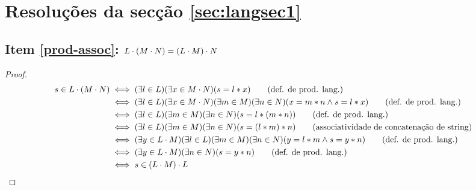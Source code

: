 \section{Resoluções da secção \ref{sec:langsec1}}

\subsection{Item \ref{prod-assoc}: $L \cdot (M \cdot N) = (L \cdot M) \cdot N$}

\begin{proof}
	\begin{align*}
	s \in \prodlang{L}{(\prodlang{M}{N})} 
	& \iff (\exists l \in L)( \exists x \in \prodlang{M}{N})(s = l \strconcat x) \tag{def. de prod. lang.}
	\\ & \iff (\exists l \in L)( \exists x \in \prodlang{M}{N})(\exists m \in M)(\exists n \in N)(x = m \strconcat n \land s = l \strconcat x) \tag{def. de prod. lang.} %
	\\ & \iff (\exists l \in L)(\exists m \in M)(\exists n \in N)(s = l \strconcat (m \strconcat n)) \tag{def. de prod. lang.}
	\\ & \iff (\exists l \in L)(\exists m \in M)(\exists n \in N)(s = (l \strconcat m) \strconcat n) \tag{associatividade de concatenação de string} %
	\\ & \iff (\exists y \in \prodlang{L}{M})(\exists l \in L)(\exists m \in M)(\exists n \in N)(y = l \strconcat m \land s = y \strconcat n) \tag{def. de prod. lang.}
	\\ & \iff (\exists y \in \prodlang{L}{M})(\exists n \in N)(s = y \strconcat n) \tag{def. de prod. lang.}
	\\ & \iff s \in \prodlang{(\prodlang{L}{M})}{L}
	\end{align*}
\end{proof}